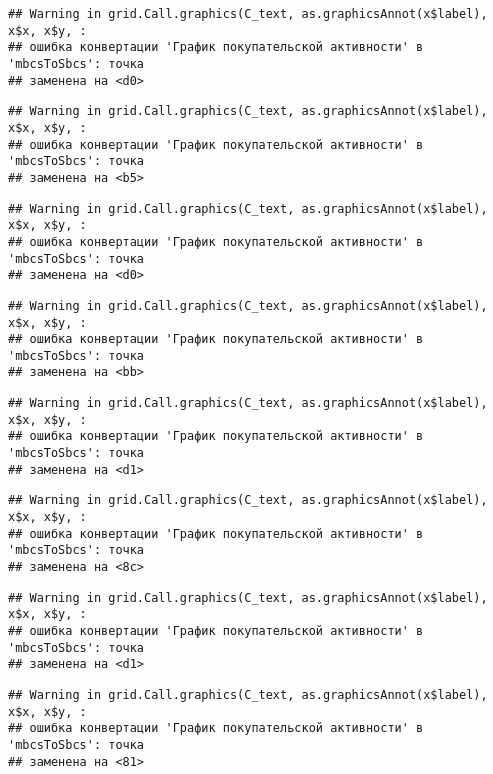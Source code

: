 \documentclass[
]{article}
\begin{document}
\begin{verbatim}
## Warning in grid.Call.graphics(C_text, as.graphicsAnnot(x$label), x$x, x$y, :
## ошибка конвертации 'График покупательской активности' в 'mbcsToSbcs': точка
## заменена на <d0>
\end{verbatim}

\begin{verbatim}
## Warning in grid.Call.graphics(C_text, as.graphicsAnnot(x$label), x$x, x$y, :
## ошибка конвертации 'График покупательской активности' в 'mbcsToSbcs': точка
## заменена на <b5>
\end{verbatim}

\begin{verbatim}
## Warning in grid.Call.graphics(C_text, as.graphicsAnnot(x$label), x$x, x$y, :
## ошибка конвертации 'График покупательской активности' в 'mbcsToSbcs': точка
## заменена на <d0>
\end{verbatim}

\begin{verbatim}
## Warning in grid.Call.graphics(C_text, as.graphicsAnnot(x$label), x$x, x$y, :
## ошибка конвертации 'График покупательской активности' в 'mbcsToSbcs': точка
## заменена на <bb>
\end{verbatim}

\begin{verbatim}
## Warning in grid.Call.graphics(C_text, as.graphicsAnnot(x$label), x$x, x$y, :
## ошибка конвертации 'График покупательской активности' в 'mbcsToSbcs': точка
## заменена на <d1>
\end{verbatim}

\begin{verbatim}
## Warning in grid.Call.graphics(C_text, as.graphicsAnnot(x$label), x$x, x$y, :
## ошибка конвертации 'График покупательской активности' в 'mbcsToSbcs': точка
## заменена на <8c>
\end{verbatim}

\begin{verbatim}
## Warning in grid.Call.graphics(C_text, as.graphicsAnnot(x$label), x$x, x$y, :
## ошибка конвертации 'График покупательской активности' в 'mbcsToSbcs': точка
## заменена на <d1>
\end{verbatim}

\begin{verbatim}
## Warning in grid.Call.graphics(C_text, as.graphicsAnnot(x$label), x$x, x$y, :
## ошибка конвертации 'График покупательской активности' в 'mbcsToSbcs': точка
## заменена на <81>
\end{verbatim}
\end{document}
